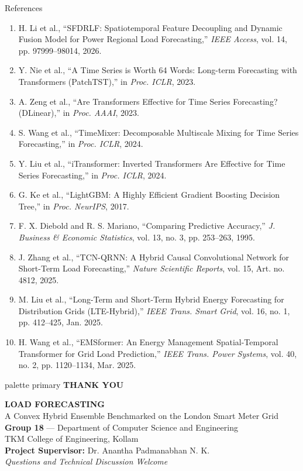 \documentclass[aspectratio=169]{beamer}
\begin{document}
\begin{frame}[allowframebreaks]{References}
\begin{enumerate}
    \item H. Li et al., ``SFDRLF: Spatiotemporal Feature Decoupling and Dynamic Fusion Model for Power Regional Load Forecasting,'' \emph{IEEE Access}, vol. 14, pp. 97999--98014, 2026.
    \item Y. Nie et al., ``A Time Series is Worth 64 Words: Long-term Forecasting with Transformers (PatchTST),'' in \emph{Proc. ICLR}, 2023.
    \item A. Zeng et al., ``Are Transformers Effective for Time Series Forecasting? (DLinear),'' in \emph{Proc. AAAI}, 2023.
    \item S. Wang et al., ``TimeMixer: Decomposable Multiscale Mixing for Time Series Forecasting,'' in \emph{Proc. ICLR}, 2024.
    \item Y. Liu et al., ``iTransformer: Inverted Transformers Are Effective for Time Series Forecasting,'' in \emph{Proc. ICLR}, 2024.
    \item G. Ke et al., ``LightGBM: A Highly Efficient Gradient Boosting Decision Tree,'' in \emph{Proc. NeurIPS}, 2017.
    \item F. X. Diebold and R. S. Mariano, ``Comparing Predictive Accuracy,'' \emph{J. Business \& Economic Statistics}, vol. 13, no. 3, pp. 253--263, 1995.
    \item J. Zhang et al., ``TCN-QRNN: A Hybrid Causal Convolutional Network for Short-Term Load Forecasting,'' \emph{Nature Scientific Reports}, vol. 15, Art. no. 4812, 2025.
    \item M. Liu et al., ``Long-Term and Short-Term Hybrid Energy Forecasting for Distribution Grids (LTE-Hybrid),'' \emph{IEEE Trans. Smart Grid}, vol. 16, no. 1, pp. 412--425, Jan. 2025.
    \item H. Wang et al., ``EMSformer: An Energy Management Spatial-Temporal Transformer for Grid Load Prediction,'' \emph{IEEE Trans. Power Systems}, vol. 40, no. 2, pp. 1120--1134, Mar. 2025.
  \end{enumerate}
\end{frame}

\begin{frame}
  \centering
  \vspace{15pt}
  \begin{beamercolorbox}[sep=10pt,center,rounded=true,shadow=true]{palette primary}
    \Huge \textbf{THANK YOU}
  \end{beamercolorbox}
  \vspace{12pt}
  {\large \textbf{LOAD FORECASTING}}\\[4pt]
  {\small A Convex Hybrid Ensemble Benchmarked on the London Smart Meter Grid}\\[8pt]
  \textbf{Group 18} --- Department of Computer Science and Engineering\\
  TKM College of Engineering, Kollam\\[4pt]
  \textbf{Project Supervisor:} Dr. Anantha Padmanabhan N. K.\\[10pt]
  \textit{Questions and Technical Discussion Welcome}
\end{frame}
\end{document}

